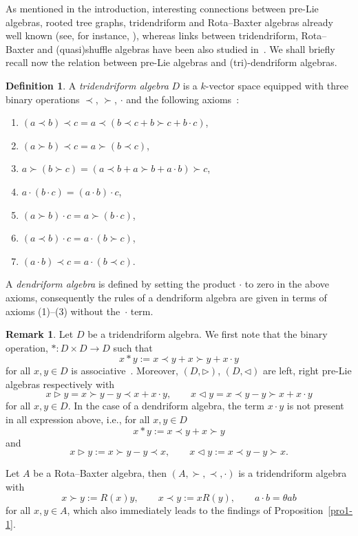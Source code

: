\documentclass[10pt,a4paper]{amsart}
\numberwithin{equation}{section}
\theoremstyle{definition}
\newtheorem{defn}[thm]{Definition}
\newtheorem{rem}[thm]{Remark}
\def\mathcal#1{#1}%
\begin{document}
As mentioned in the introduction, interesting connections between pre-Lie algebras, rooted tree graphs, tridendriform and Rota--Baxter algebras already well known (see, for instance, \mbox{\cite{Chap1, Fer}}), whereas links between tridendriform, Rota--Baxter and (quasi)shuffle algebras have been also studied in~\cite{LodaySh}. We shall briefly recall now the relation between pre-Lie algebras and (tri)-dendriform algebras.
\begin{defn}
A {\it tridendriform algebra} ${\mathcal D}$ is a $k$-vector space equipped with three binary operations $\prec$, $\succ$, $\cdot$ and the following axioms~\cite{Dendri, Loday}:
\begin{enumerate}\itemsep=0pt
\item[(1)] $(a \prec b) \prec c = a \prec (b\prec c + b\succ c + b\cdot c)$,
\item[(2)] $(a \succ b) \prec c = a \succ (b\prec c)$,
\item[(3)] $a \succ(b \succ c) = (a \prec b + a\succ b + a\cdot b)\succ c$,
\item[(4)] $a\cdot (b \cdot c) = (a\cdot b)\cdot c$,
\item[(5)] $(a\succ b) \cdot c = a\succ( b\cdot c)$,
\item[(6)] $(a\prec b) \cdot c = a\cdot(b\succ c)$,
\item[(7)] $(a\cdot b) \prec c = a\cdot (b\prec c)$.
\end{enumerate}
\end{defn}

 A {\it dendriform algebra} is defined by setting the product $\cdot$ to zero in the above axioms,
consequently the rules of a dendriform algebra are given in terms of axioms (1)--(3) without the~$\cdot$ term.

\begin{rem} Let ${\mathcal D}$ be a tridendriform algebra.
We first note that the binary operation, $*\colon {\mathcal D} \times {\mathcal D} \to {\mathcal D}$ such that
\[
x*y := x\prec y + x\succ y + x\cdot y
\]
for all $x,y \in {\mathcal D}$ is associative~\cite{Loday}. Moreover, $({\mathcal D}, \triangleright)$, $({\mathcal D}, \triangleleft)$ are left, right pre-Lie algebras respectively with
\[
x\triangleright y = x\succ y - y\prec x + x\cdot y, \qquad x\triangleleft y = x\prec y-y\succ x +x\cdot y
\]
for all $x,y \in {\mathcal D}$. In the case of a dendriform algebra, the term $x\cdot y$ is not present in all expression above, i.e., for all $x,y \in {\mathcal D}$
\[
x* y := x\prec y + x\succ y
\]
and
\[
x\triangleright y := x\succ y - y\prec x, \qquad x\triangleleft y := x\prec y-y\succ x .
\]

Let $\mathcal{A}$ be a Rota--Baxter algebra, then $(\mathcal{A},\succ,\prec, \cdot)$ is a tridendriform algebra with~\cite{RBLoday}
\begin{equation}
x\succ y := R(x) y, \qquad x\prec y := x R(y), \qquad a\cdot b = \theta ab \label{action2}
\end{equation}
for all $x,y\in \mathcal{A}$, which also immediately leads to the findings of Proposition~\ref{pro1-1}.
\end{rem}
\end{document}
